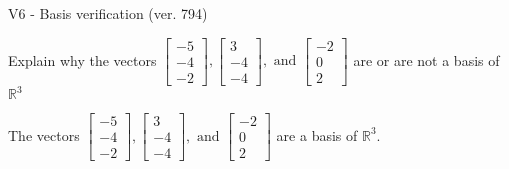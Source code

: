 \begin{exercise}
  \begin{exerciseTitle}V6 - Basis verification (ver. 794)\end{exerciseTitle}
  \begin{exerciseStatement}
    Explain why the vectors \(\left[\begin{array}{r}
-5 \\
-4 \\
-2
\end{array}\right] , \left[\begin{array}{r}
3 \\
-4 \\
-4
\end{array}\right] , \text{ and } \left[\begin{array}{r}
-2 \\
0 \\
2
\end{array}\right]\) are or are not a basis of \(\mathbb{R}^3\)	


  \end{exerciseStatement}
  \begin{exerciseAnswer}
   The vectors \(\left[\begin{array}{r}
-5 \\
-4 \\
-2
\end{array}\right] , \left[\begin{array}{r}
3 \\
-4 \\
-4
\end{array}\right] , \text{ and } \left[\begin{array}{r}
-2 \\
0 \\
2
\end{array}\right]\) 
  	 are  a basis of \(\mathbb{R}^3\).
  


  \end{exerciseAnswer}
\end{exercise}